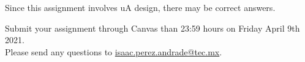 \documentclass[number=03]{assignment}
\newcommand{\deadline}{23:59 hours on Friday April 9th 2021}
\begin{document}
 Since this assignment involves \ac{uA} design, there may be  correct answers.

Submit your assignment through Canvas  than \deadline. 
\\
Please send any questions to \href{mailto:isaac.perez.andrade@tec.mx}{isaac.perez.andrade@tec.mx}.
\end{document}
